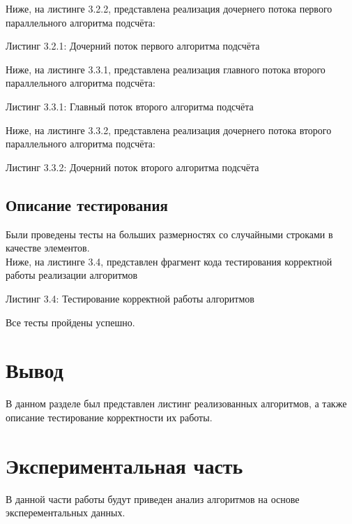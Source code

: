 \documentclass[12pt,a4paper]{article}
\numberwithin{equation}{section}
\begin{document}
Ниже, на листинге 3.2.2, представлена реализация дочернего потока первого параллельного алгоритма подсчёта:
\begin{center}
	Листинг 3.2.1: Дочерний поток первого алгоритма подсчёта
	
\end{center}
\clearpage

Ниже, на листинге 3.3.1, представлена реализация главного потока второго параллельного алгоритма подсчёта:
\begin{center}
	Листинг 3.3.1: Главный поток второго алгоритма подсчёта
	
\end{center}

Ниже, на листинге 3.3.2, представлена реализация дочернего потока второго параллельного алгоритма подсчёта:
\begin{center}
	Листинг 3.3.2: Дочерний поток второго алгоритма подсчёта
	
\end{center}
\clearpage


\subsection{Описание тестирования} %
Были проведены тесты на больших размерностях со случайными строками в качестве элементов.\\
\qquad Ниже, на листинге 3.4, представлен фрагмент кода тестирования корректной работы реализации алгоритмов
\begin{center}
	Листинг 3.4: Тестирование корректной работы алгоритмов
		
\end{center}

Все тесты пройдены успешно.

\section*{Вывод}
\qquad В данном разделе был представлен листинг реализованных алгоритмов, а также описание тестирование корректности их работы.
\clearpage

\section{Экспериментальная часть}
\qquad В данной части работы будут приведен анализ алгоритмов на основе эксперементальных данных.
\end{document}
